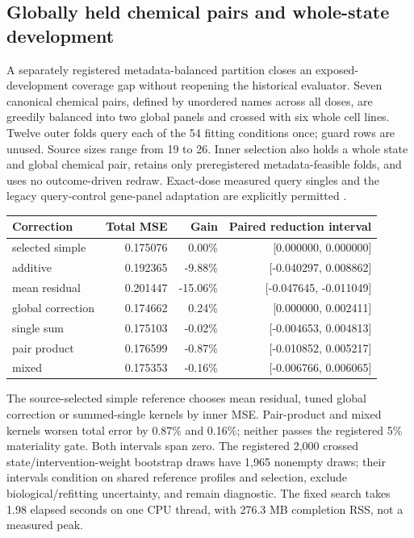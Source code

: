 \subsection{Globally held chemical pairs and whole-state development}
A separately registered metadata-balanced partition closes an exposed-development coverage gap without reopening the historical evaluator. Seven canonical chemical pairs, defined by unordered names across all doses, are greedily balanced into two global panels and crossed with six whole cell lines. Twelve outer folds query each of the 54 fitting conditions once; guard rows are unused. Source sizes range from 19 to 26. Inner selection also holds a whole state and global chemical pair, retains only preregistered metadata-feasible folds, and uses no outcome-driven redraw. Exact-dose measured query singles and the legacy query-control gene-panel adaptation are explicitly permitted \citep{opaljoint2026}.
\begin{center}\small\begin{tabular}{lrrr}\toprule
Correction & Total MSE & Gain & Paired reduction interval\\\midrule
selected simple & 0.175076 & 0.00\% & [0.000000, 0.000000]\\
additive & 0.192365 & -9.88\% & [-0.040297, 0.008862]\\
mean residual & 0.201447 & -15.06\% & [-0.047645, -0.011049]\\
global correction & 0.174662 & 0.24\% & [0.000000, 0.002411]\\
single sum & 0.175103 & -0.02\% & [-0.004653, 0.004813]\\
pair product & 0.176599 & -0.87\% & [-0.010852, 0.005217]\\
mixed & 0.175353 & -0.16\% & [-0.006766, 0.006065]\\
\bottomrule\end{tabular}\end{center}
The source-selected simple reference chooses mean residual, tuned global correction or summed-single kernels by inner MSE. Pair-product and mixed kernels worsen total error by 0.87\% and 0.16\%; neither passes the registered 5\% materiality gate. Both intervals span zero. The registered 2,000 crossed state/intervention-weight bootstrap draws have 1,965 nonempty draws; their intervals condition on shared reference profiles and selection, exclude biological/refitting uncertainty, and remain diagnostic. The fixed search takes 1.98 elapsed seconds on one CPU thread, with 276.3 MB completion RSS, not a measured peak.
